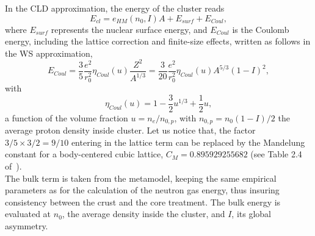 In the CLD approximation, the energy of the cluster reads
%
\begin{equation}
  E_{cl} = e_{HM}(n_0, I)A + E_{surf} + E_{Coul},
\end{equation}
%
where $E_{surf}$ represents the nuclear surface energy, and $E_{Coul}$ is the Coulomb
energy, including the lattice correction and finite-size effects, written 
as follows in the WS approximation,
%
\begin{equation}
  E_{Coul} = \frac{3}{5}\frac{e^2}{r_0^2}\eta_{Coul}(u)\frac{Z^2}{A^{1/3}} =
  \frac{3}{20}\frac{e^2}{r_0^2}\eta_{Coul}(u)A^{5/3}(1-I)^2,\label{eq:ecoul}
\end{equation}
%
with
%
\begin{equation}
  \eta_{Coul}(u) = 1-\frac{3}{2}u^{1/3} + \frac{1}{2}u,\label{eq:fcoul}
\end{equation}
%
a function of the volume fraction $u = n_e/n_{0,p}$, with $n_{0,p} =
n_0(1-I)/2$ the average proton density inside cluster. Let us notice that, 
the factor $3/5 \times 3/2 = 9/10$ entering in the lattice term can be
replaced by the Mandelung constant for a body-centered cubic lattice, $C_M =
0.895929255682$ (see Table 2.4 of~\cite{Haensel2007}).\\
The bulk term is taken from the metamodel, keeping the same empirical parameters
as for the calculation of the neutron gas energy, thus insuring consistency
between the crust and the core treatment. 
The bulk energy is evaluated at $n_0$, the average density inside the cluster, 
and $I$, its global asymmetry.


